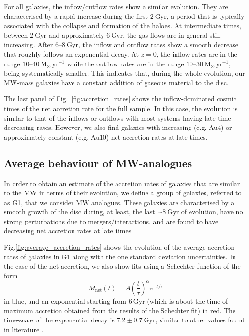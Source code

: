 \documentclass[baaa]{baaa}
\begin{document}
For all galaxies, the inflow/outflow rates show a similar evolution.
They are characterised by a rapid increase during the first $2~\mathrm{Gyr}$, a period that is typically associated with the collapse and formation of the haloes.
At intermediate times, between $2~\mathrm{Gyr}$ and approximately $6~\mathrm{Gyr}$, the gas flows are in general still increasing.
After $6$--$8~\mathrm{Gyr}$, the inflow and outflow rates show a smooth decrease that roughly follows an exponential decay.
At $z=0$, the inflow rates are in the range $10$--$40~\mathrm{M}_\odot \, \mathrm{yr}^{-1}$ while the outflow rates are in the range $10$--$30~\mathrm{M}_\odot \, \mathrm{yr}^{-1}$, being systematically smaller.
This indicates that, during the whole evolution, our MW-mass galaxies have a constant addition of gaseous material to the disc.  

The last panel of Fig.~\ref{fig:accretion_rates} shows the inflow-dominated cosmic times of the net accretion rate for the full sample.
In this case, the evolution is similar to that of the inflows or outflows with most systems having late-time decreasing rates.
However, we also find galaxies with increasing (e.g. Au4) or approximately constant (e.g. Au10) net accretion rates at late times.

\subsection{Average behaviour of MW-analogues}
\label{sec:results-average_behaviour}

In order to obtain an estimate of the accretion rates of galaxies that are similar to the MW in terms of their evolution, we define a group of galaxies, referred to as G1, that we consider MW analogues.  
These galaxies are characterised by a smooth growth of the disc during, at least, the last $\sim 8~\mathrm{Gyr}$ of evolution, have no strong perturbations due to mergers/interactions, and are found to have decreasing net accretion rates at late times.

Fig.\ref{fig:average_accretion_rates} shows the evolution of the average accretion rates of galaxies in G1 along with the one standard deviation uncertainties.
In the case of the net accretion, we also show fits using a Schechter function of the form
\begin{equation*} \dot{M}_\mathrm{net}(t) = A \left( \frac{t}{\tau} \right)^\alpha \mathrm{e}^{- t / \tau} \end{equation*}
in blue, and an exponential starting from $6~\mathrm{Gyr}$ (which is about the time of maximum accretion obtained from the results of the Schechter fit) in red.
The time-scale of the exponential decay is $7.2 \pm 0.7 ~\mathrm{Gyr}$, similar to other values found in literature \citep{Nuza2019}.
\end{document}
